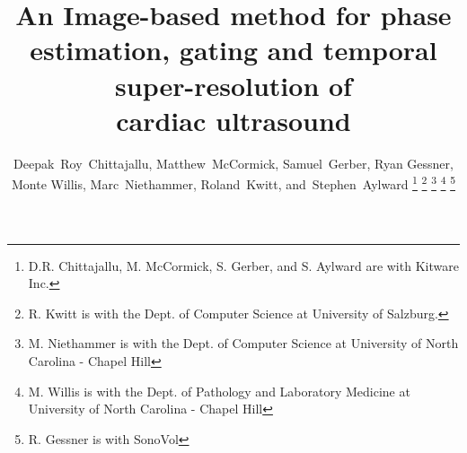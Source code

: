 \documentclass[journal]{IEEEtran}
\begin{document}
%
\title{An Image-based method for phase estimation, gating and temporal super-resolution of \\cardiac ultrasound}
%
%
%

\author{Deepak~Roy~Chittajallu,
        Matthew~McCormick,
        Samuel~Gerber,
        Ryan Gessner,
        Monte Willis,
        Marc~Niethammer,
        Roland~Kwitt,
        and~Stephen~Aylward%
\thanks{D.R. Chittajallu, M. McCormick, S. Gerber, and S. Aylward are with Kitware Inc.}%
\thanks{R. Kwitt is with the Dept. of Computer Science at University of Salzburg.}%
\thanks{M. Niethammer is with the Dept. of Computer Science at University of North Carolina - Chapel Hill}%
\thanks{M. Willis is with the Dept. of Pathology and Laboratory Medicine at University of North Carolina - Chapel Hill}%
\thanks{R. Gessner is with SonoVol}%
}

% 
%
\end{document}
